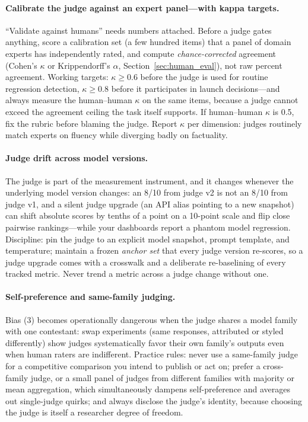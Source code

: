 \paragraph{Calibrate the judge against an expert panel---with kappa targets.}
``Validate against humans'' needs numbers attached.  Before a judge gates
anything, score a calibration set (a few hundred items) that a panel of
domain experts has independently rated, and compute \emph{chance-corrected}
agreement (Cohen's $\kappa$ or Krippendorff's $\alpha$,
Section~\ref{sec:human_eval}), not raw percent agreement.  Working targets:
$\kappa \geq 0.6$ before the judge is used for routine regression detection,
$\kappa \geq 0.8$ before it participates in launch decisions---and always
measure the human--human $\kappa$ on the same items, because a judge cannot
exceed the agreement ceiling the task itself supports.  If human--human
$\kappa$ is 0.5, fix the rubric before blaming the judge.  Report $\kappa$
per dimension: judges routinely match experts on fluency while diverging
badly on factuality.

\paragraph{Judge drift across model versions.}
The judge is part of the measurement instrument, and it changes whenever the
underlying model version changes: an 8/10 from judge v2 is not an 8/10 from
judge v1, and a silent judge upgrade (an API alias pointing to a new
snapshot) can shift absolute scores by tenths of a point on a 10-point scale
and flip close pairwise rankings---while your dashboards report a phantom
model regression.  Discipline: pin the judge to an explicit model snapshot,
prompt template, and temperature; maintain a frozen \emph{anchor set} that
every judge version re-scores, so a judge upgrade comes with a crosswalk and
a deliberate re-baselining of every tracked metric.  Never trend a metric
across a judge change without one.

\paragraph{Self-preference and same-family judging.}
Bias (3) becomes operationally dangerous when the judge shares a model
family with one contestant: swap experiments (same responses, attributed or
styled differently) show judges systematically favor their own family's
outputs even when human raters are indifferent.  Practice rules: never use a
same-family judge for a competitive comparison you intend to publish or act
on; prefer a cross-family judge, or a small panel of judges from different
families with majority or mean aggregation, which simultaneously dampens
self-preference and averages out single-judge quirks; and always disclose
the judge's identity, because choosing the judge is itself a researcher
degree of freedom.

